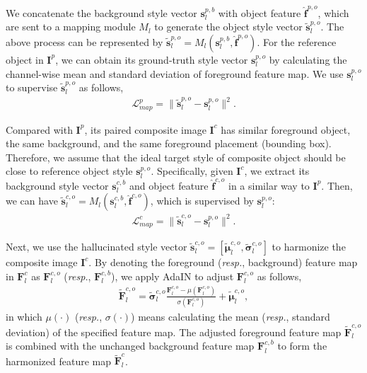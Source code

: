 \documentclass[letterpaper]{article} %
\begin{document}
We concatenate the background style vector $\bm{s}^{p,b}_l$ with object feature $\hat{\bm{f}}^{p,o}$, which are sent to a mapping module $M_l$ to generate the object style vector $\tilde{\bm{s}}^{p,o}_l$.
The above process can be represented by $\tilde{\bm{s}}^{p,o}_l=M_l(\bm{s}^{p,b}_l, \hat{\bm{f}}^{p,o})$.
For the reference object in  $\bm{I}^p$, we can obtain its ground-truth style vector $\bm{s}^{p,o}_l$ by calculating the channel-wise mean and standard deviation of foreground feature map. We use $\bm{s}^{p,o}_l$ to supervise $\tilde{\bm{s}}^{p,o}_l$ as follows,
\begin{eqnarray}
\mathcal{L}_{map}^p = \|\tilde{\bm{s}}^{p,o}_l-\bm{s}^{p,o}_l\|^2.
\end{eqnarray}

Compared with $\bm{I}^p$, its paired composite image $\bm{I}^c$ has similar foreground object, the same background, and the same foreground placement (bounding box). Therefore, we assume that the ideal target style of composite object should be close to reference object style $\bm{s}^{p,o}_l$.
Specifically, given $\bm{I}^c$, we extract its background style vector $\bm{s}^{c,b}_l$ and object feature $\hat{\bm{f}}^{c,o}$ in a similar way to $\bm{I}^p$. Then, we can have $\tilde{\bm{s}}^{c,o}_l=M_l(\bm{s}^{c,b}_l, \hat{\bm{f}}^{c,o})$, which is supervised by $\bm{s}^{p,o}_l$:
\begin{eqnarray}
\mathcal{L}_{map}^c = \|\tilde{\bm{s}}^{c,o}_l-\bm{s}^{p,o}_l\|^2.
\end{eqnarray}

Next, we use the hallucinated style vector $\tilde{\bm{s}}^{c,o}_l=[\tilde{\bm{\mu}}^{c,o}_l, \tilde{\bm{\sigma}}^{c,o}_l]$ to harmonize the composite image  $\bm{I}^c$. By denoting the foreground (\emph{resp.}, background) feature map in $\bm{F}_l^c$ as $\bm{F}^{c,o}_l$ (\emph{resp.}, $\bm{F}^{c,b}_l$), we apply AdaIN to adjust $\bm{F}^{c,o}_l$ as follows,
\begin{eqnarray}\label{eqn:adain}
    \tilde{\bm{F}}^{c,o}_{l} = \tilde{\bm{\sigma}}^{c,o}_l\frac{\bm{F}^{c,o}_l-\mu(\bm{F}^{c,o}_l)}{\sigma(\bm{F}^{c,o}_l)} + \tilde{\bm{\mu}}^{c,o}_l,
\end{eqnarray}
in which $\mu(\cdot)$ (\emph{resp.}, $\sigma(\cdot)$) means calculating the mean (\emph{resp.}, standard deviation) of the specified feature map. The adjusted foreground feature map $\tilde{\bm{F}}^{c,o}_{l}$ is combined with the unchanged background feature map $\bm{F}^{c,b}_l$ to form the harmonized feature map $\tilde{\bm{F}}^{c}_{l}$.
\end{document}
